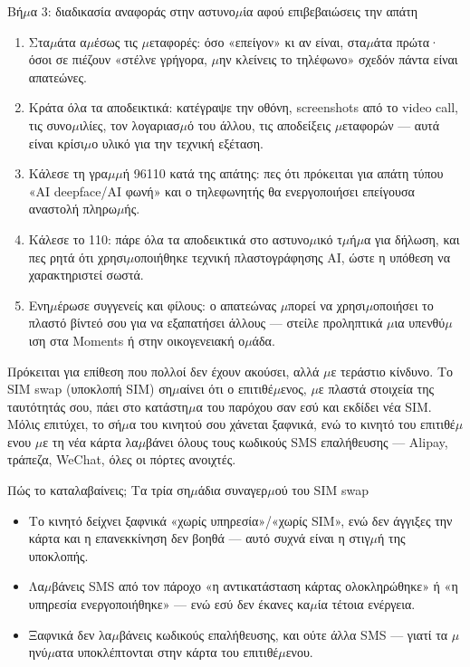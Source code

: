 \begin{tcbwarn}{Βή$\mu$α 3: διαδικασία αναφοράς στην αστυνο$\mu$ία αφού επιβεβαιώσεις την απάτη}
\begin{enumerate}
  \item Στα$\mu$άτα α$\mu$έσως τις $\mu$εταφορές: όσο «επείγον» κι αν είναι, στα$\mu$άτα πρώτα· όσοι σε πιέζουν «στέλνε γρήγορα, $\mu$ην κλείνεις το τηλέφωνο» σχεδόν πάντα είναι απατεώνες.
  \item Κράτα όλα τα αποδεικτικά: κατέγραψε την οθόνη, screenshots από το video call, τις συνο$\mu$ιλίες, τον λογαριασ$\mu$ό του άλλου, τις αποδείξεις $\mu$εταφορών — αυτά είναι κρίσι$\mu$ο υλικό για την τεχνική εξέταση.
  \item Κάλεσε τη γρα$\mu$$\mu$ή 96110 κατά της απάτης: πες ότι πρόκειται για απάτη τύπου «AI deepface/AI φωνή» και ο τηλεφωνητής θα ενεργοποιήσει επείγουσα αναστολή πληρω$\mu$ής.
  \item Κάλεσε το 110: πάρε όλα τα αποδεικτικά στο αστυνο$\mu$ικό τ$\mu$ή$\mu$α για δήλωση, και πες ρητά ότι χρησι$\mu$οποιήθηκε τεχνική πλαστογράφησης AI, ώστε η υπόθεση να χαρακτηριστεί σωστά.
  \item Ενη$\mu$έρωσε συγγενείς και φίλους: ο απατεώνας $\mu$πορεί να χρησι$\mu$οποιήσει το πλαστό βίντεό σου για να εξαπατήσει άλλους — στείλε προληπτικά $\mu$ια υπενθύ$\mu$ιση στα Moments ή στην οικογενειακή ο$\mu$άδα.
\end{enumerate}

\end{tcbwarn}


Πρόκειται για επίθεση που πολλοί δεν έχουν ακούσει, αλλά $\mu$ε τεράστιο κίνδυνο. Το SIM swap (υποκλοπή SIM) ση$\mu$αίνει ότι ο επιτιθέ$\mu$ενος, $\mu$ε πλαστά στοιχεία της ταυτότητάς σου, πάει στο κατάστη$\mu$α του παρόχου σαν εσύ και εκδίδει νέα SIM. Μόλις επιτύχει, το σή$\mu$α του κινητού σου χάνεται ξαφνικά, ενώ το κινητό του επιτιθέ$\mu$ενου $\mu$ε τη νέα κάρτα λα$\mu$βάνει όλους τους κωδικούς SMS επαλήθευσης — Alipay, τράπεζα, WeChat, όλες οι πόρτες ανοιχτές.

\begin{tcbinfo}{Πώς το καταλαβαίνεις; Τα τρία ση$\mu$άδια συναγερ$\mu$ού του SIM swap}
\begin{itemize}
  \item Το κινητό δείχνει ξαφνικά «χωρίς υπηρεσία»/«χωρίς SIM», ενώ δεν άγγιξες την κάρτα και η επανεκκίνηση δεν βοηθά — αυτό συχνά είναι η στιγ$\mu$ή της υποκλοπής.
  \item Λα$\mu$βάνεις SMS από τον πάροχο «η αντικατάσταση κάρτας ολοκληρώθηκε» ή «η υπηρεσία ενεργοποιήθηκε» — ενώ εσύ δεν έκανες κα$\mu$ία τέτοια ενέργεια.
  \item Ξαφνικά δεν λα$\mu$βάνεις κωδικούς επαλήθευσης, και ούτε άλλα SMS — γιατί τα $\mu$ηνύ$\mu$ατα υποκλέπτονται στην κάρτα του επιτιθέ$\mu$ενου.
\end{itemize}

\end{tcbinfo}

